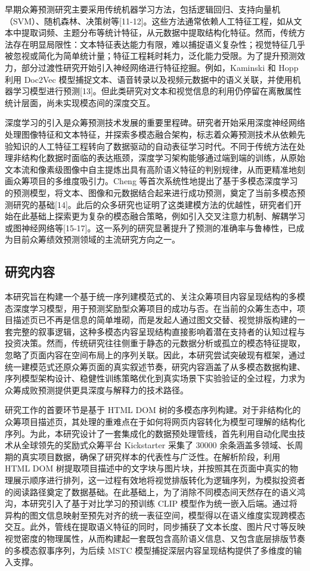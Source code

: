 早期众筹预测研究主要采用传统机器学习方法，包括逻辑回归、支持向量机（SVM）、随机森林、决策树等[11-12]。这些方法通常依赖人工特征工程，如从文本中提取词频、主题分布等统计特征，从元数据中提取结构化特征。然而，传统方法存在明显局限性：文本特征表达能力有限，难以捕捉语义复杂性；视觉特征几乎被忽视或简化为简单统计量；特征工程耗时耗力，泛化能力受限。为了提升预测效力，部分过渡性研究开始引入神经网络进行特征挖掘。例如，Kaminski 和 Hopp 利用 Doc2Vec 模型捕捉文本、语音转录以及视频元数据中的语义关联，并使用机器学习模型进行预测[13]。但此类研究对文本和视觉信息的利用仍停留在离散属性统计层面，尚未实现模态间的深度交互。

深度学习的引入是众筹预测技术发展的重要里程碑。研究者开始采用深度神经网络处理图像特征和文本特征，并探索多模态融合架构，标志着众筹预测技术从依赖先验知识的人工特征工程转向了数据驱动的自动表征学习时代。不同于传统方法在处理非结构化数据时面临的表达瓶颈，深度学习架构能够通过端到端的训练，从原始文本流和像素级图像中自主提炼出具有高阶语义特征的判别规律，从而更精准地刻画众筹项目的多维度吸引力。Cheng 等首次系统性地提出了基于多模态深度学习的预测模型，将文本、图像和元数据结合起来进行成功预测，奠定了当前多模态预测研究的基础[14]。此后的众多研究也证明了这类建模方法的优越性，研究者们开始在此基础上探索更为复杂的模态融合策略，例如引入交叉注意力机制、解耦学习或图神经网络等[15-17]。这一系列的研究显著提升了预测的准确率与鲁棒性，已成为目前众筹绩效预测领域的主流研究方向之一。

\subsection{研究内容}

本研究旨在构建一个基于统一序列建模范式的、关注众筹项目内容呈现结构的多模态深度学习模型，用于预测奖励型众筹项目的成功与否。在当前的众筹生态中，项目描述页已不再是信息的简单堆砌，而是发起人通过图文交替、视觉排版构建的一套完整的叙事逻辑，这种多模态内容呈现结构直接影响着潜在支持者的认知过程与投资决策。然而，传统研究往往侧重于静态的元数据分析或孤立的模态特征提取，忽略了页面内容在空间布局上的序列关联。因此，本研究尝试突破现有框架，通过统一建模范式还原众筹页面的真实叙述节奏，研究内容涵盖了从多模态数据构建、序列模型架构设计、稳健性训练策略优化到真实场景下实验验证的全过程，力求为众筹成败预测提供更具深度与解释力的技术路径。

研究工作的首要环节是基于 HTML DOM 树的多模态序列构建。对于非结构化的众筹项目描述页，其处理的重难点在于如何将网页内容转化为模型可理解的结构化序列。为此，本研究设计了一套集成化的数据预处理管线，首先利用自动化爬虫技术从全球领先的奖励式众筹平台 Kickstarter 采集了 30000 余条涵盖多领域、长周期的真实项目数据，确保了研究样本的代表性与广泛性。在解析阶段，利用 HTML DOM 树提取项目描述中的文字块与图片块，并按照其在页面中真实的物理展示顺序进行排列，这一过程有效地将视觉排版转化为逻辑序列，为模拟投资者的阅读路径奠定了数据基础。在此基础上，为了消除不同模态间天然存在的语义鸿沟，本研究引入了基于对比学习的预训练 CLIP 模型作为统一嵌入后端。通过将异构的图文信息映射至预先对齐的统一表征空间，模型得以在语义维度实现跨模态交互。此外，管线在提取语义特征的同时，同步捕获了文本长度、图片尺寸等反映视觉密度的物理属性，从而构建起一套既包含高阶语义信息、又包含底层排版节奏的多模态叙事序列，为后续 MSTC 模型捕捉深层内容呈现结构提供了多维度的输入支撑。

